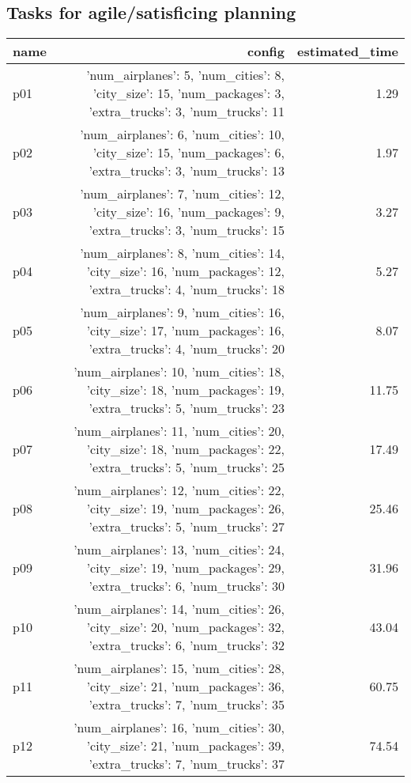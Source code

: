 \documentclass{article}
\begin{document}
                                \subsection*{Tasks for agile/satisficing planning}
                                
                            \begin{center}
                            \scriptsize
                            \begin{tabular}{@{}l|r|r@{}}
                            name & config & estimated\_time\\\midrule
                              p01&{'num\_airplanes': 5, 'num\_cities': 8, 'city\_size': 15, 'num\_packages': 3, 'extra\_trucks': 3, 'num\_trucks': 11}&1.29\\
  p02&{'num\_airplanes': 6, 'num\_cities': 10, 'city\_size': 15, 'num\_packages': 6, 'extra\_trucks': 3, 'num\_trucks': 13}&1.97\\
  p03&{'num\_airplanes': 7, 'num\_cities': 12, 'city\_size': 16, 'num\_packages': 9, 'extra\_trucks': 3, 'num\_trucks': 15}&3.27\\
  p04&{'num\_airplanes': 8, 'num\_cities': 14, 'city\_size': 16, 'num\_packages': 12, 'extra\_trucks': 4, 'num\_trucks': 18}&5.27\\
  p05&{'num\_airplanes': 9, 'num\_cities': 16, 'city\_size': 17, 'num\_packages': 16, 'extra\_trucks': 4, 'num\_trucks': 20}&8.07\\
  p06&{'num\_airplanes': 10, 'num\_cities': 18, 'city\_size': 18, 'num\_packages': 19, 'extra\_trucks': 5, 'num\_trucks': 23}&11.75\\
  p07&{'num\_airplanes': 11, 'num\_cities': 20, 'city\_size': 18, 'num\_packages': 22, 'extra\_trucks': 5, 'num\_trucks': 25}&17.49\\
  p08&{'num\_airplanes': 12, 'num\_cities': 22, 'city\_size': 19, 'num\_packages': 26, 'extra\_trucks': 5, 'num\_trucks': 27}&25.46\\
  p09&{'num\_airplanes': 13, 'num\_cities': 24, 'city\_size': 19, 'num\_packages': 29, 'extra\_trucks': 6, 'num\_trucks': 30}&31.96\\
  p10&{'num\_airplanes': 14, 'num\_cities': 26, 'city\_size': 20, 'num\_packages': 32, 'extra\_trucks': 6, 'num\_trucks': 32}&43.04\\
  p11&{'num\_airplanes': 15, 'num\_cities': 28, 'city\_size': 21, 'num\_packages': 36, 'extra\_trucks': 7, 'num\_trucks': 35}&60.75\\
  p12&{'num\_airplanes': 16, 'num\_cities': 30, 'city\_size': 21, 'num\_packages': 39, 'extra\_trucks': 7, 'num\_trucks': 37}&74.54\\

\end{tabular}
\end{center}
\end{document}
